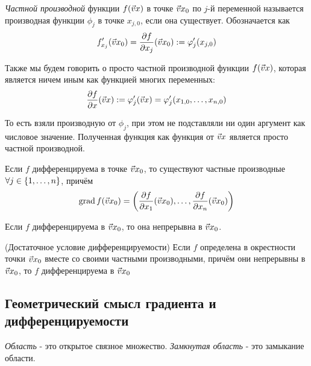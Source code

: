 \begin{multicols}{2}
    \begin{definition}{}{}
        \textit{Частной производной} функции $f(\vec{v}{x})$ в точке $\vec{v}{x}_0$ по $j$-й переменной называется производная функции $\phi_j$ в точке $x_{j, 0}$, если она существует. Обозначается как 
        \[
            f'_{x_j}(\vec{v}{x}_0) = \frac{\partial f}{\partial x_j} (\vec{v}{x}_0) := \varphi'_j (x_{j, 0})
        \]
    \end{definition}
    
    \begin{definition}{}{}
        Также мы будем говорить о просто частной производной функции $f(\vec{v}{x})$, которая является ничем иным как функцией многих переменных:
        \[
            \frac{\partial f}{\partial x} (\vec{v}{x}) := \varphi'_j(\vec{v}{x}) = \varphi'_j (x_{1, 0}, \ldots, x_{n, 0})
        \]
    \end{definition}
    
    \begin{note}{}{}
        То есть взяли производную от $\phi_j$, при этом не подставляли ни один аргумент как числовое значение. Полученная функция как функция от $\vec{v}{x}$ является просто частной производной.
    \end{note}
    
    \begin{theorema}{}{}
        Если $f$ дифференцируема в точке $\vec{v}{x}_0$, то существуют частные производные $\forall j \in \{1, \ldots, n\}$, причём
        \[
            \operatorname{grad} f(\vec{v}{x}_0) = \left(\dfrac{\partial f}{\partial x_1}(\vec{v}{x}_0), \ldots, \dfrac{\partial f}{\partial x_n}(\vec{v}{x}_0)\right)
        \]
    \end{theorema}
    
    \begin{theorema}{}{}
        Если $f$ дифференцируема в $\vec{v}{x}_0$, то она непрерывна в $\vec{v}{x}_0$.
    \end{theorema}
    
    
    \begin{theorema}{(Достаточное условие дифференцируемости)}{}
        Если $f$ определена в окрестности точки $\vec{v}{x}_0$ вместе со своими частными производными, причём они непрерывны в $\vec{v}{x}_0$, то $f$ дифференцируема в $\vec{v}{x}_0$
    \end{theorema}
    \subsection*{Геометрический смысл градиента и дифференцируемости}

\begin{definition}
	\textit{Область} - это открытое связное множество. \textit{Замкнутая область} - это замыкание области.
\end{definition}


\end{multicols}
